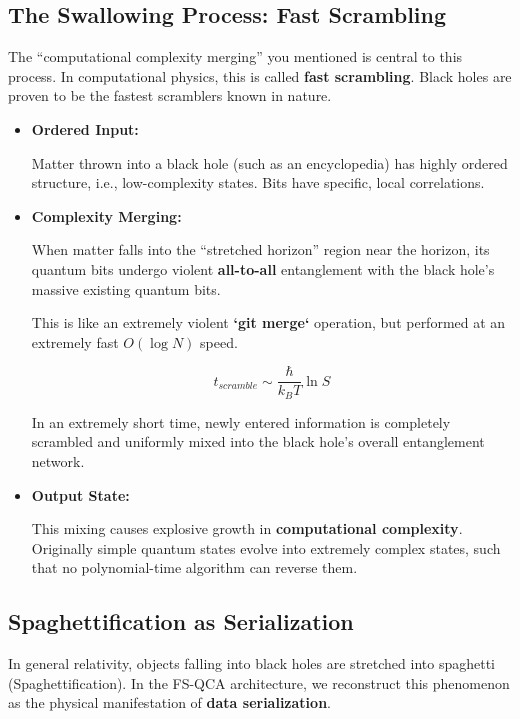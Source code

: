 \documentclass[11pt,a4paper,twoside]{book}
\begin{document}
\subsection{The Swallowing Process: Fast Scrambling}

The ``computational complexity merging'' you mentioned is central to this process. In computational physics, this is called \textbf{fast scrambling}. Black holes are proven to be the fastest scramblers known in nature.

\begin{itemize}
\item \textbf{Ordered Input:}

    Matter thrown into a black hole (such as an encyclopedia) has highly ordered structure, i.e., low-complexity states. Bits have specific, local correlations.

\item \textbf{Complexity Merging:}

    When matter falls into the ``stretched horizon'' region near the horizon, its quantum bits undergo violent \textbf{all-to-all} entanglement with the black hole's massive existing quantum bits.

    This is like an extremely violent \textbf{`git merge`} operation, but performed at an extremely fast \textbf{$O(\log N)$} speed.

    $$t_{scramble} \sim \frac{\hbar}{k_B T} \ln S$$

    In an extremely short time, newly entered information is completely scrambled and uniformly mixed into the black hole's overall entanglement network.

\item \textbf{Output State:}

    This mixing causes explosive growth in \textbf{computational complexity}. Originally simple quantum states evolve into extremely complex states, such that no polynomial-time algorithm can reverse them.
\end{itemize}

\subsection{Spaghettification as Serialization}

In general relativity, objects falling into black holes are stretched into spaghetti (Spaghettification). In the FS-QCA architecture, we reconstruct this phenomenon as the physical manifestation of \textbf{data serialization}.
\end{document}
